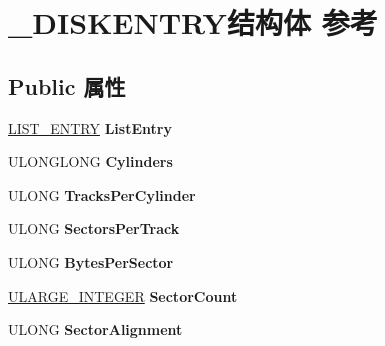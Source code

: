 \hypertarget{struct___d_i_s_k_e_n_t_r_y}{}\section{\+\_\+\+D\+I\+S\+K\+E\+N\+T\+R\+Y结构体 参考}
\label{struct___d_i_s_k_e_n_t_r_y}
\subsection*{Public 属性}
\begin{DoxyCompactItemize}
\item 
\mbox{\label{struct___d_i_s_k_e_n_t_r_y_aa638bc3e4b80ac67d3d35899b0fbd65a}} 
\hyperlink{struct___l_i_s_t___e_n_t_r_y}{L\+I\+S\+T\+\_\+\+E\+N\+T\+RY} {\bfseries List\+Entry}
\item 
\mbox{\label{struct___d_i_s_k_e_n_t_r_y_a95f5189b7d9ff1175d866b1459bdd9b1}} 
U\+L\+O\+N\+G\+L\+O\+NG {\bfseries Cylinders}
\item 
\mbox{\label{struct___d_i_s_k_e_n_t_r_y_acd187f4862c31b51704dc115e4bc7279}} 
U\+L\+O\+NG {\bfseries Tracks\+Per\+Cylinder}
\item 
\mbox{\label{struct___d_i_s_k_e_n_t_r_y_a425dd722eb41e75e4a538e10a17ea59e}} 
U\+L\+O\+NG {\bfseries Sectors\+Per\+Track}
\item 
\mbox{\label{struct___d_i_s_k_e_n_t_r_y_a6d299d4207535521d3ca14eaa8ed2c14}} 
U\+L\+O\+NG {\bfseries Bytes\+Per\+Sector}
\item 
\mbox{\label{struct___d_i_s_k_e_n_t_r_y_a356cf80df46a6ade5319d175867351a8}} 
\hyperlink{struct___u_l_a_r_g_e___i_n_t_e_g_e_r}{U\+L\+A\+R\+G\+E\+\_\+\+I\+N\+T\+E\+G\+ER} {\bfseries Sector\+Count}
\item 
\mbox{\label{struct___d_i_s_k_e_n_t_r_y_a1328a417af9fca8e466ffca87b7e7c14}} 
U\+L\+O\+NG {\bfseries Sector\+Alignment}
\item 
\mbox{\label{struct___d_i_s_k_e_n_t_r_y_aec78507554319663f9338e51d6e31e4b}} 

\end{DoxyCompactItemize}

